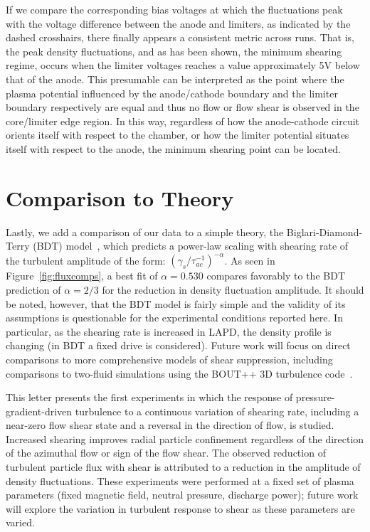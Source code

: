 \documentclass[aip,pop,amsmath,amssymb,preprint,superscriptaddress]{revtex4-1} %
\begin{document}
If we compare the corresponding bias voltages at which the fluctuations peak with the voltage difference between the anode and limiters, as indicated by the dashed crosshairs, there finally appears a consistent metric across runs. That is, the peak density fluctuations, and as has been shown, the minimum shearing regime, occurs when the limiter voltages reaches a value approximately 5V below that of the anode. This presumable can be interpreted as the point where the plasma potential influenced by the anode/cathode boundary and the limiter boundary respectively are equal and thus no flow or flow shear is observed in the core/limiter edge region. In this way, regardless of how the anode-cathode circuit orients itself with respect to the chamber, or how the limiter potential situates itself with respect to the anode, the minimum shearing point can be located.

\section{Comparison to Theory}

Lastly, we add a comparison of our data to a simple theory, the
Biglari-Diamond-Terry (BDT) model~\cite{biglari90}, which predicts a
power-law scaling with shearing rate of the turbulent
amplitude of the form: $\left(\gamma_{s}/\tau_{ac}^{-1}\right)^{-\alpha}$. As seen in
Figure~\ref{fig:fluxcomps}, a best fit of $\alpha = 0.530$ compares
favorably to the BDT prediction of $\alpha = 2/3$ for the reduction in
density fluctuation amplitude. 
It should be noted, however, that the
BDT model is fairly simple and the validity of its assumptions is
questionable for the experimental conditions reported here.  In
particular, as the shearing rate is increased in LAPD, the density
profile is changing (in BDT a fixed drive is considered).  Future work
will focus on direct comparisons to more comprehensive models of shear
suppression, including comparisons to two-fluid simulations using the
BOUT++ 3D turbulence code~\cite{umansky11}.  

This letter presents the first experiments in which the response of
pressure-gradient-driven turbulence to a continuous
variation of shearing rate, including a near-zero flow shear state and
a reversal in the direction of flow, is studied.  Increased shearing
improves radial particle confinement regardless of the direction of
the azimuthal flow or sign of the flow shear. The observed reduction of
turbulent particle flux with shear is attributed to a reduction in the
amplitude of density fluctuations. These
experiments were performed at a fixed set of plasma parameters (fixed
magnetic field, neutral pressure, discharge power); future work will
explore the variation in turbulent response to shear as these
parameters are varied.  
\end{document}
